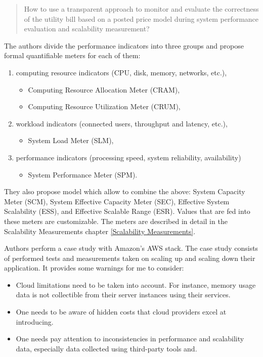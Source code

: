 \documentclass{uvamscse}
\begin{document}
\begin{quote}
 How to use a transparent approach to monitor and evaluate the correctness of the utility bill based on a posted price model during system performance evaluation and scalability measurement?
\end{quote}

The authors divide the performance indicators into three groups and propose formal quantifiable meters for each of them:
\begin{enumerate}
  \item computing resource indicators (CPU, disk, memory, networks, etc.),
  \begin{itemize}
    \item Computing Resource Allocation Meter (CRAM),
    \item Computing Resource Utilization Meter (CRUM),
  \end{itemize}
  \item workload indicators (connected users, throughput and latency, etc.),
  \begin{itemize}
    \item System Load Meter (SLM),
  \end{itemize}
  \item performance indicators (processing speed, system reliability, availability)
  \begin{itemize}
    \item System Performance Meter (SPM).
  \end{itemize}
\end{enumerate}
They also propose model which allow to combine the above: System Capacity Meter (SCM), System Effective Capacity Meter (SEC), Effective System Scalability (ESS), and Effective Scalable Range (ESR). Values that are fed into these meters are customizable. The meters are described in detail in the Scalability Measurements chapter \ref{Scalability Measurements}.

Authors perform a case study with Amazon's AWS stack. The case study consists of performed tests and measurements taken on scaling up and scaling down their application. It provides some warnings for me to consider:
\begin{itemize}
  \item Cloud limitations need to be taken into account. For instance, memory usage data is not collectible from their server instances using their services.
  \item One needs to be aware of hidden costs that cloud providers excel at introducing.
  \item One needs pay attention to inconsistencies in performance and scalability data, especially data collected using third-party tools and.
\end{itemize}
\end{document}
